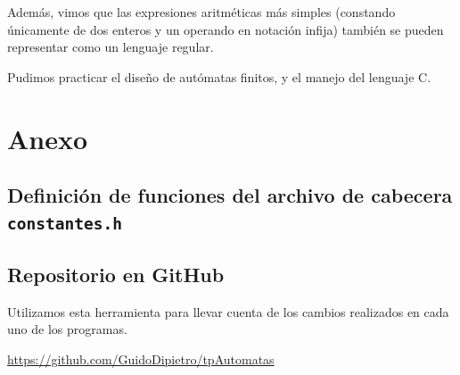 \documentclass[a4paper, 12pt]{article}
\begin{document}
Además, vimos que las expresiones aritméticas más simples (constando únicamente de dos enteros y un operando en notación infija) también se pueden representar como un lenguaje regular.

Pudimos practicar el diseño de autómatas finitos, y el manejo del lenguaje C.

\newpage
\section{Anexo} \label{anexo}
\bigbreak
\subsection{Definición de funciones del archivo de cabecera \texttt{constantes.h}} \label{constantesc}


\subsection{Repositorio en GitHub}
\label{repo}

Utilizamos esta herramienta para llevar cuenta de los cambios realizados en cada uno de los programas.

\begin{center}
\url{https://github.com/GuidoDipietro/tpAutomatas}
\end{center}
\end{document}
